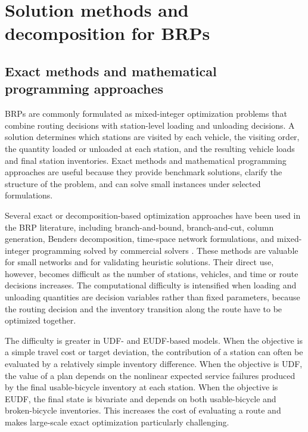 \section{Solution methods and decomposition for BRPs}

\subsection{Exact methods and mathematical programming approaches}

BRPs are commonly formulated as mixed-integer optimization problems that combine routing decisions with station-level loading and unloading decisions. A solution determines which stations are visited by each vehicle, the visiting order, the quantity loaded or unloaded at each station, and the resulting vehicle loads and final station inventories. Exact methods and mathematical programming approaches are useful because they provide benchmark solutions, clarify the structure of the problem, and can solve small instances under selected formulations.

Several exact or decomposition-based optimization approaches have been used in the BRP literature, including branch-and-bound, branch-and-cut, column generation, Benders decomposition, time-space network formulations, and mixed-integer programming solved by commercial solvers \citep{caggianiModularSoftComputing2012,contardoBalancingDynamicPublic2012,ravivStaticRepositioningBikesharing2013,dellamicoDestroyRepairAlgorithm2016,brinkmannInventoryRoutingBike2016}. These methods are valuable for small networks and for validating heuristic solutions. Their direct use, however, becomes difficult as the number of stations, vehicles, and time or route decisions increases. The computational difficulty is intensified when loading and unloading quantities are decision variables rather than fixed parameters, because the routing decision and the inventory transition along the route have to be optimized together.

The difficulty is greater in UDF- and EUDF-based models. When the objective is a simple travel cost or target deviation, the contribution of a station can often be evaluated by a relatively simple inventory difference. When the objective is UDF, the value of a plan depends on the nonlinear expected service failures produced by the final usable-bicycle inventory at each station. When the objective is EUDF, the final state is bivariate and depends on both usable-bicycle and broken-bicycle inventories. This increases the cost of evaluating a route and makes large-scale exact optimization particularly challenging.

